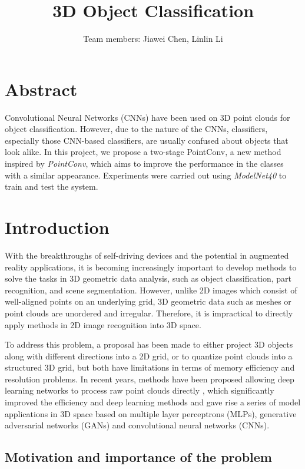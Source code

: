 \documentclass{article}
\title{3D Object Classification}
\author{
  Team members: Jiawei Chen, Linlin Li
}
\begin{document}
\maketitle
\section*{Abstract}
Convolutional Neural Networks (CNNs) have been used on 3D point clouds for object classification. However, due to the nature of the CNNs, classifiers, especially those CNN-based classifiers, are usually confused about objects that look alike. In this project, we propose a two-stage PointConv, a new method inspired by \textit{PointConv}, which aims to improve the performance in the classes with a similar appearance. Experiments were carried out using \textit{ModelNet40} to train and test the system.

\section{Introduction}

With the breakthroughs of self-driving devices and the potential in augmented reality applications, it is becoming increasingly important to develop methods to solve the tasks in 3D geometric data analysis, such as object classification, part recognition, and scene segmentation. However, unlike 2D images which consist of well-aligned points on an underlying grid, 3D geometric data such as meshes or point clouds are unordered and irregular. Therefore, it is impractical to directly apply methods in 2D image recognition into 3D space. 

To address this problem, a proposal has been made to either project 3D objects along with different directions into a 2D grid, or to quantize point clouds into a structured 3D grid, but both have limitations in terms of memory efficiency and resolution problems. In recent years, methods have been proposed allowing deep learning networks to process raw point clouds directly \cite{pointnet}, which significantly improved the efficiency and deep learning methods and gave rise a series of model applications in 3D space based on multiple layer perceptrons (MLPs), generative adversarial networks (GANs) and convolutional neural networks (CNNs).

\subsection{Motivation and importance of the problem}
\end{document}
